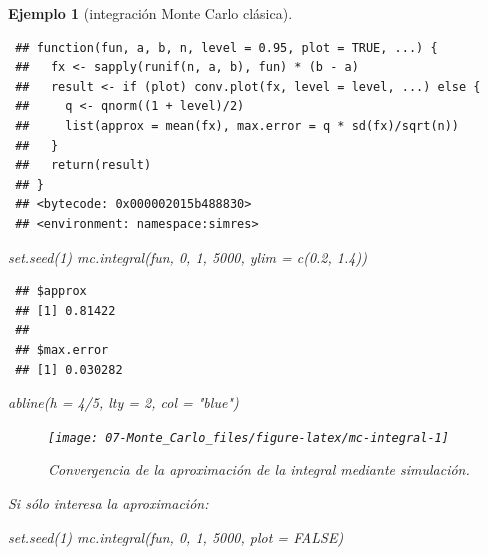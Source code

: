 \documentclass[
  10pt,
]{book}
\newenvironment{Shaded}{\begin{snugshade}}{\end{snugshade}}
\newcommand{\AttributeTok}[1]{\textcolor[rgb]{0.77,0.63,0.00}{#1}}
\newcommand{\ConstantTok}[1]{\textcolor[rgb]{0.00,0.00,0.00}{#1}}
\newcommand{\DecValTok}[1]{\textcolor[rgb]{0.00,0.00,0.81}{#1}}
\newcommand{\FloatTok}[1]{\textcolor[rgb]{0.00,0.00,0.81}{#1}}
\newcommand{\FunctionTok}[1]{\textcolor[rgb]{0.00,0.00,0.00}{#1}}
\newcommand{\NormalTok}[1]{#1}
\newcommand{\SpecialCharTok}[1]{\textcolor[rgb]{0.00,0.00,0.00}{#1}}
\newcommand{\StringTok}[1]{\textcolor[rgb]{0.31,0.60,0.02}{#1}}
\theoremstyle{break}
\newtheorem{example}{Ejemplo}[chapter]
\theoremstyle{nonumberplain}
\begin{document}
\begin{example}[integración Monte Carlo clásica]
\begin{verbatim}
 ## function(fun, a, b, n, level = 0.95, plot = TRUE, ...) {
 ##   fx <- sapply(runif(n, a, b), fun) * (b - a)
 ##   result <- if (plot) conv.plot(fx, level = level, ...) else {
 ##     q <- qnorm((1 + level)/2)
 ##     list(approx = mean(fx), max.error = q * sd(fx)/sqrt(n))
 ##   }
 ##   return(result)
 ## }
 ## <bytecode: 0x000002015b488830>
 ## <environment: namespace:simres>
\end{verbatim}

\begin{Shaded}
\begin{Highlighting}[]
\FunctionTok{set.seed}\NormalTok{(}\DecValTok{1}\NormalTok{)}
\FunctionTok{mc.integral}\NormalTok{(fun, }\DecValTok{0}\NormalTok{, }\DecValTok{1}\NormalTok{, }\DecValTok{5000}\NormalTok{, }\AttributeTok{ylim =} \FunctionTok{c}\NormalTok{(}\FloatTok{0.2}\NormalTok{, }\FloatTok{1.4}\NormalTok{))}
\end{Highlighting}
\end{Shaded}

\begin{verbatim}
 ## $approx
 ## [1] 0.81422
 ## 
 ## $max.error
 ## [1] 0.030282
\end{verbatim}

\begin{Shaded}
\begin{Highlighting}[]
\FunctionTok{abline}\NormalTok{(}\AttributeTok{h =} \DecValTok{4}\SpecialCharTok{/}\DecValTok{5}\NormalTok{, }\AttributeTok{lty =} \DecValTok{2}\NormalTok{, }\AttributeTok{col =} \StringTok{"blue"}\NormalTok{)}
\end{Highlighting}
\end{Shaded}

\begin{figure}[!htbp]

{\centering \texttt{[image: 07-Monte\_Carlo\_files/figure-latex/mc-integral-1]} 

}

\caption{Convergencia de la aproximación de la integral mediante simulación.}\label{fig:mc-integral}
\end{figure}

Si sólo interesa la aproximación:

\begin{Shaded}
\begin{Highlighting}[]
\FunctionTok{set.seed}\NormalTok{(}\DecValTok{1}\NormalTok{)}
\FunctionTok{mc.integral}\NormalTok{(fun, }\DecValTok{0}\NormalTok{, }\DecValTok{1}\NormalTok{, }\DecValTok{5000}\NormalTok{, }\AttributeTok{plot =} \ConstantTok{FALSE}\NormalTok{)}
\end{Highlighting}
\end{Shaded}


\end{example}
\end{document}
